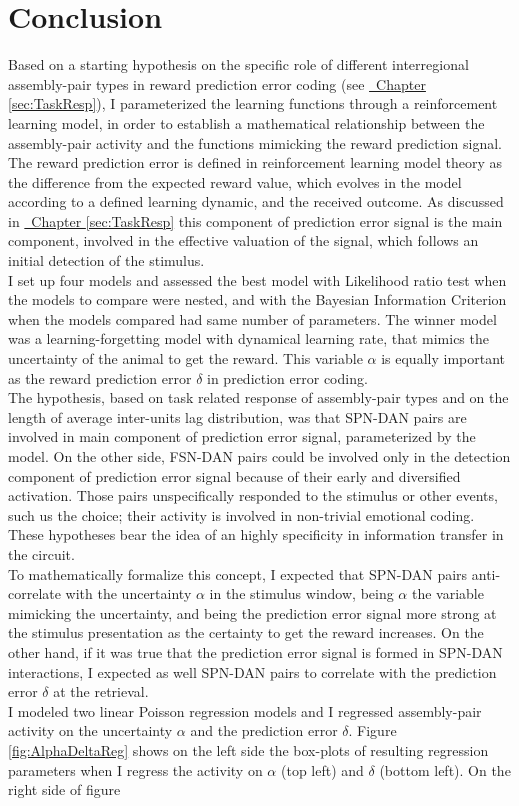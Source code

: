 \section{Conclusion}
\label{sec:concRL}
Based on a starting hypothesis on the specific role of different interregional assembly-pair types in reward prediction error coding (see \hyperref[sec:TaskResp]{~Chapter \ref*{sec:TaskResp}}), I parameterized the learning functions through a reinforcement learning model, in order to establish a mathematical relationship between the assembly-pair activity and the functions mimicking the reward prediction signal.\\The reward prediction error is defined in reinforcement learning model theory as the difference from the expected reward value, which evolves in the model according to a defined learning dynamic, and the received outcome. As discussed in \hyperref[sec:TaskResp]{~Chapter \ref*{sec:TaskResp}} this component of prediction error signal is the main component, involved in the effective valuation of the signal, which follows an initial detection of the stimulus.\\I set up four models and assessed the best model with Likelihood ratio test when the models to compare were nested, and with the Bayesian Information Criterion when the models compared had same number of parameters. The winner model was a learning-forgetting model with dynamical learning rate, that mimics the uncertainty of the animal to get the reward. This variable $\alpha$ is equally important as the reward prediction error $\delta$ in prediction error coding.\\The hypothesis, based on task related response of assembly-pair types and on the length of average inter-units lag distribution, was that SPN-DAN pairs are involved in main component of prediction error signal, parameterized by the model. On the other side, FSN-DAN pairs could be involved only in the detection component of prediction error signal because of their early and diversified activation. Those pairs unspecifically responded to the stimulus or other events, such us the choice; their activity is involved in non-trivial emotional coding.\\These hypotheses bear the idea of an highly specificity in information transfer in the circuit.\\To mathematically formalize this concept, I expected that SPN-DAN pairs anti-correlate with the uncertainty $\alpha$ in the stimulus window, being $\alpha$ the variable mimicking the uncertainty, and being the prediction error signal more strong at the stimulus presentation as the certainty to get the reward increases. On the other hand, if it was true that the prediction error signal is formed in SPN-DAN interactions, I expected as well SPN-DAN pairs to correlate with the prediction error $\delta$ at the retrieval.\\I modeled two linear Poisson regression models and I regressed assembly-pair activity on the uncertainty $\alpha$ and the prediction error $\delta$. Figure \ref{fig:AlphaDeltaReg} shows on the left side the box-plots of resulting regression parameters when I regress the activity on $\alpha$ (top left) and $\delta$ (bottom left). On the right side of figure 